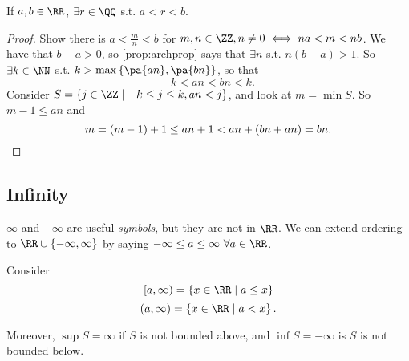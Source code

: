 \documentclass[11pt]{scrartcl}
\numberwithin{equation}{section}
\begin{document}
\begin{proposition}
    [Denseness of $\QQ$]
    \label{prop:denseq}
    If $a,b\in\RR$, $\exists r\in\QQ$ s.t. $a<r<b$.
\end{proposition}
\begin{proof}
    Show there is $a<\frac{m}{n}<b$ for $m,n\in\ZZ, n\neq 0 \iff na < m <nb$.
    We have that $b-a>0$, so \cref{prop:archprop} says that $\exists n$ s.t.
    $n(b-a) >1$. So $\exists k \in \NN$ s.t. $k>\max \left\{\pa{an},\pa{bn}\right\}$, so that 
    \[ -k <an <bn < k.\]
    Consider $S = \left\{j\in\ZZ\mid-k\leq j\leq k, an < j\right\}$,
    and look at $m = \min S$.
    So $m-1\leq an$ and
    \[ m = (m-1) + 1\leq an+1<an+(bn+an) = bn. \qedhere \]
\end{proof}
\subsection{Infinity}
$\infty$ and $-\infty$ are useful \textit{symbols}, 
but they are not in $\RR$.
We can extend ordering to $\RR\cup \left\{-\infty, \infty\right\}$ 
by saying $-\infty \leq a \leq \infty \ \forall a\in \RR$.
\begin{example}
    Consider 
    \[ [a,\infty) = \left\{x\in\RR\mid a\leq x\right\}\]
    \[ (a,\infty) = \left\{x\in\RR\mid a< x\right\}.\]
\end{example}

Moreover, $\sup S= \infty$ if $S$ is not bounded above, and 
$\inf S = -\infty$ is $S$ is not bounded below.
\end{document}
